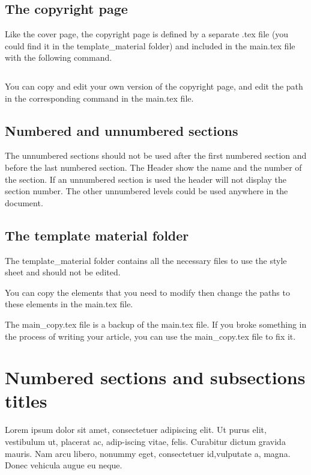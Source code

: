 \documentclass[Theme1]{{template_material/eurostat}}
\begin{document}
\subsection{The copyright page}

Like the cover page, the copyright page is defined by a separate .tex file (you could find it in the template\_material folder) and included in the main.tex file with the following command. 
\begin{verbatim}

\end{verbatim}

You can copy and edit your own version of the copyright page, and edit the path in the corresponding  command in the main.tex file. 


\subsection{Numbered and unnumbered sections}

The unnumbered sections should not be used after the first numbered section and before the last numbered section. The Header show the name and the number of the section. If an unnumbered section is used the header will not display the section number. The other unnumbered levels could be used anywhere in the document.

\subsection{The template material folder}

The template\_material folder contains all the necessary files to use the style sheet and should not be edited. 

You can copy the elements that you need to modify then change the paths to these elements in the main.tex file.

The main\_copy.tex file is a backup of the main.tex file. If you broke something in the process of writing your article, you can use the main\_copy.tex file to fix it. 

\newpage %
\section{Numbered sections and subsections titles}
Lorem ipsum dolor sit amet, consectetuer adipiscing elit. Ut purus elit, vestibulum ut, placerat ac, adip-iscing vitae, felis. Curabitur dictum gravida mauris. Nam arcu libero, nonummy eget, consectetuer id,vulputate a, magna. Donec vehicula augue eu neque.
\end{document}
